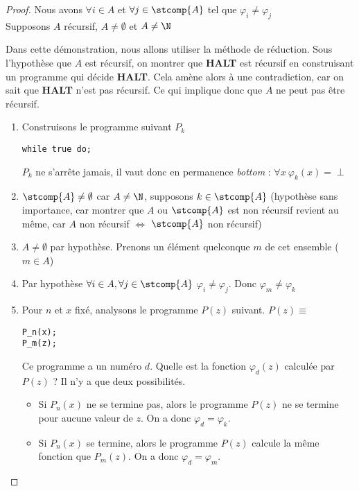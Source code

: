 \begin{proof}
Nous avons $\forall i \in A$ et $\forall j \in \stcomp{A}$ tel que $\varphi_i \neq
\varphi_j$\\
Supposons $A$ récursif, $A \neq \emptyset$ et $A\neq \N$

Dans cette démonstration, nous allons utiliser la méthode de réduction.
Sous l'hypothèse que $A$ est récursif, on montrer que \textbf{HALT} est récursif en construisant un programme qui décide \textbf{HALT}.  Cela amène alors à une contradiction, car on sait que \textbf{HALT} n'est pas récursif.  Ce qui implique donc que $A$ ne peut pas être récursif.

\begin{enumerate}
	\item Construisons le programme suivant $P_k$
		\begin{lstlisting}
while true do;
		\end{lstlisting}
			$P_k$ ne s'arrête jamais, il vaut donc en permanence \textit{bottom} : $\forall x \ \varphi_k(x) = \perp$
			
	\item $\stcomp{A}\neq \emptyset$ car $A \neq \N$,
	supposons $k\in \stcomp{A}$ (hypothèse sans importance, car montrer que
	$A$ ou $\stcomp{A}$ est non récursif revient au même, car $A$ non
	récursif $ \Leftrightarrow $ $\stcomp{A}$ non récursif)
	\item $A\neq \emptyset$ par hypothèse.  Prenons un élément quelconque $m$ de cet ensemble  ($m\in A$)
	\item Par hypothèse  $\forall i \in A, \forall j \in \stcomp{A}$ $\varphi_i \neq \varphi_j$.  Donc 
		$\varphi_m \neq \varphi_k$
	\item Pour $n$ et $x$ fixé, analysons le programme $P(z)$ suivant. 
		$P(z) \equiv $
		\begin{lstlisting}
P_n(x);
P_m(z);
		\end{lstlisting}

			Ce programme a un numéro $d$.  Quelle est la fonction $\varphi_d(z)$ calculée par $P(z)$ ? Il n'y a que deux possibilités.
			\begin{itemize}
				\item Si $P_n(x)$ ne se termine pas, alors le programme $P(z)$ ne se termine pour aucune valeur de $z$. On a donc $\varphi_d =\varphi_k$. 
				\item Si $P_n(x)$ se termine, alors le programme $P(z)$ calcule la même fonction que $P_m(z)$. On a donc $\varphi_d =\varphi_m$. 
			\end{itemize}


\end{enumerate}
\end{proof}
